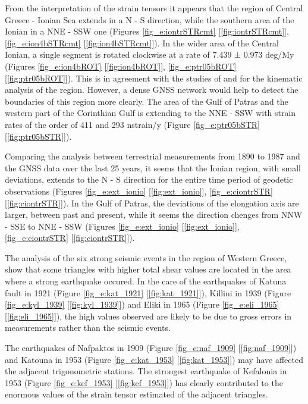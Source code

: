 \begin{extsum}
From the interpretation of the strain tensors it appears that the region of Central Greece - Ionian Sea extends in a N - S direction, while the southern area of ​​the Ionian in a NNE - SSW one (Figures \ref{fig_e:iontrSTRcmt} [\ref{fig:iontrSTRcmt}], \ref{fig_e:ion4bSTRcmt} [\ref{fig:ion4bSTRcmt}]). In the wider area of ​​the Central Ionian, a single segment is rotated clockwise at a rate of 7.439 ± 0.973 deg/My (Figures \ref{fig_e:ion4bROT} [\ref{fig:ion4bROT}], \ref{fig_e:ptr05bROT} [\ref{fig:ptr05bROT}]). This is in agreement with the studies of \citet{Perouse2013} and \citet{Chousianitis2015} for the kinematic analysis of the region. However, a dense GNSS network would help to detect the boundaries of this region more clearly. The area of ​​the Gulf of Patras and the western part of the Corinthian Gulf is extending to the NNE - SSW with strain rates of the order of 411 and 293 nstrain/y (Figure \ref{fig_e:ptr05bSTR} [\ref{fig:ptr05bSTR}]).

Comparing the analysis between terrestrial measurements from 1890 to 1987 and the GNSS data over the last 25 years, it seems that the Ionian region, with small deviations, extends to the N - S direction for the entire time period of geodetic observations (Figures \ref{fig_e:ext_ionio} [\ref{fig:ext_ionio}], \ref{fig_e:ciontrSTR} [\ref{fig:ciontrSTR}]). In ​​the Gulf of Patras, the deviations of the elongation axis are larger, between past and present, while it seems the direction chenges from NNW - SSE to NNE - SSW (Figures \ref{fig_e:ext_ionio} [\ref{fig:ext_ionio}], \ref{fig_e:ciontrSTR} [\ref{fig:ciontrSTR}]).

The analysis of the six strong seismic events in the region of Western Greece, show that some triangles with higher total shear values are located in the area where a strong earthquake occured. In the care of the earthquakes of Katuna fault in 1921 (Figure \ref{fig_e:kat_1921} [\ref{fig:kat_1921}]), Killini in 1939 (Figure \ref{fig_e:kyl_1939} [\ref{fig:kyl_1939}]) and Eliki in 1965 (Figure \ref{fig_e:eli_1965} [\ref{fig:eli_1965}]), the high values observed are likely to be due to gross errors in measurements rather than the seismic events.

The earthquakes of Nafpaktos in 1909 (Figure \ref{fig_e:naf_1909} [\ref{fig:naf_1909}]) and Katouna in 1953 (Figure \ref{fig_e:kat_1953} [\ref{fig:kat_1953}]) may have affected the adjacent trigonometric stations. The strongest earthquake of Kefalonia in 1953 (Figure \ref{fig_e:kef_1953} [\ref{fig:kef_1953}]) has clearly contributed to the enormous values ​​of the strain tensor estimated of the adjacent triangles. 


\end{extsum}
